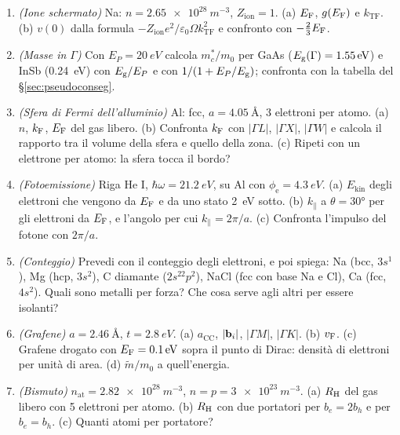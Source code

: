 \documentclass[11pt,a4paper]{article}
\begin{document}
\begin{enumerate}[label=\textbf{E\arabic*.}, leftmargin=2.3em, itemsep=2pt]
\item \emph{(Ione schermato)} Na: $n=\SI{2.65e28}{m^{-3}}$, $Z_{\mathrm{ion}}=1$. (a) $E_{\mathrm F}$, $g(E_{\mathrm F})$ e $k_{\mathrm{TF}}$. (b) $v(0)$ dalla formula
$-Z_{\mathrm{ion}}e^2/\varepsilon_0\Omega k_{\mathrm{TF}}^2$ e confronto con $-\frac23E_{\mathrm F}$.
\item \emph{(Masse in $\Gamma$)} Con $E_P=\SI{20}{eV}$ calcola $m^*_c/m_0$ per GaAs ($E_{\mathrm g}(\Gamma)=\SI{1.55}{eV}$) e InSb (\SI{0.24}{eV}) con
$E_{\mathrm g}/E_P$ e con $1/(1+E_P/E_{\mathrm g})$; confronta con la tabella del §\ref{sec:pseudoconseg}.
\item \emph{(Sfera di Fermi dell'alluminio)} Al: fcc, $a=\SI{4.05}{\angstrom}$, 3 elettroni per atomo. (a) $n$, $k_{\mathrm F}$, $E_{\mathrm F}$ del gas libero. (b) Confronta
$k_{\mathrm F}$ con $|\Gamma L|$, $|\Gamma X|$, $|\Gamma W|$ e calcola il rapporto tra il volume della sfera e quello della zona. (c) Ripeti con un elettrone per
atomo: la sfera tocca il bordo?
\item \emph{(Fotoemissione)} Riga He I, $\hbar\omega=\SI{21.2}{eV}$, su Al con $\phi_{\mathrm e}=\SI{4.3}{eV}$. (a) $E_{\mathrm{kin}}$ degli elettroni
che vengono da $E_{\mathrm F}$ e da uno stato \SI{2}{eV} sotto. (b) $k_\parallel$ a $\theta=\ang{30}$ per gli elettroni da $E_{\mathrm F}$, e l'angolo per cui
$k_\parallel=2\pi/a$. (c) Confronta l'impulso del fotone con $2\pi/a$.
\item \emph{(Conteggio)} Prevedi con il conteggio degli elettroni, e poi spiega: Na (bcc, $3s^1$), Mg (hcp, $3s^2$), C diamante ($2s^22p^2$), NaCl
(fcc con base Na e Cl), Ca (fcc, $4s^2$). Quali sono metalli per forza? Che cosa serve agli altri per essere isolanti?
\item \emph{(Grafene)} $a=\SI{2.46}{\angstrom}$, $t=\SI{2.8}{eV}$. (a) $a_{\mathrm{CC}}$, $|\mathbf b_i|$, $|\Gamma M|$, $|\Gamma K|$. (b) $v_{\mathrm F}$. (c) Grafene drogato
con $E_{\mathrm F}=\SI{0.1}{eV}$ sopra il punto di Dirac: densità di elettroni per unità di area. (d) $\tilde m/m_0$ a quell'energia.
\item \emph{(Bismuto)} $n_{\mathrm{at}}=\SI{2.82e28}{m^{-3}}$, $n=p=\SI{3e23}{m^{-3}}$. (a) $R_{\mathrm H}$ del gas libero con 5 elettroni per atomo. (b) $R_{\mathrm H}$ con due
portatori per $b_e=2b_h$ e per $b_e=b_h$. (c) Quanti atomi per portatore?
\end{enumerate}
\end{document}
